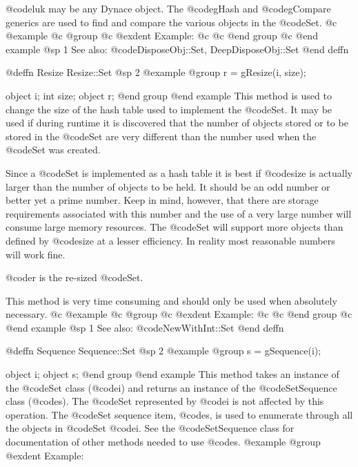 @code{luk} may be any Dynace object.  The @code{gHash} and
@code{gCompare} generics are used to find and compare the various
objects in the @code{Set}.
@c @example
@c @group
@c @exdent Example:
@c 
@c @end group
@c @end example
@sp 1
See also:  @code{DisposeObj::Set, DeepDisposeObj::Set}
@end deffn













@deffn {Resize} Resize::Set
@sp 2
@example
@group
r = gResize(i, size);

object  i;
int     size;
object  r;
@end group
@end example
This method is used to change the size of the hash table used to
implement the @code{Set}.  It may be used if during runtime it is
discovered that the number of objects stored or to be stored in the
@code{Set} are very different than the number used when the @code{Set}
was created.

Since a @code{Set} is implemented as a hash table it is best if
@code{size} is actually larger than the number of objects to be held.
It should be an odd number or better yet a prime number.  Keep in mind,
however, that there are storage requirements associated with this number
and the use of a very large number will consume large memory resources.
The @code{Set} will support more objects than defined by @code{size} at
a lesser efficiency.  In reality most reasonable numbers will work fine.

@code{r} is the re-sized @code{Set}.

This method is very time consuming and should only be used when
absolutely necessary.
@c @example
@c @group
@c @exdent Example:
@c 
@c @end group
@c @end example
@sp 1
See also:  @code{NewWithInt::Set}
@end deffn











@deffn {Sequence} Sequence::Set
@sp 2
@example
@group
s = gSequence(i);

object  i;
object  s;
@end group
@end example
This method takes an instance of the @code{Set} class (@code{i})
and returns an instance of the @code{SetSequence} class
(@code{s}).  The @code{Set} represented by @code{i} is not affected by
this operation.  The @code{Set} sequence item, @code{s}, is used to enumerate
through all the objects in @code{Set} @code{i}.  See the
@code{SetSequence} class for documentation of other methods
needed to use @code{s}.
@example
@group
@exdent Example:

